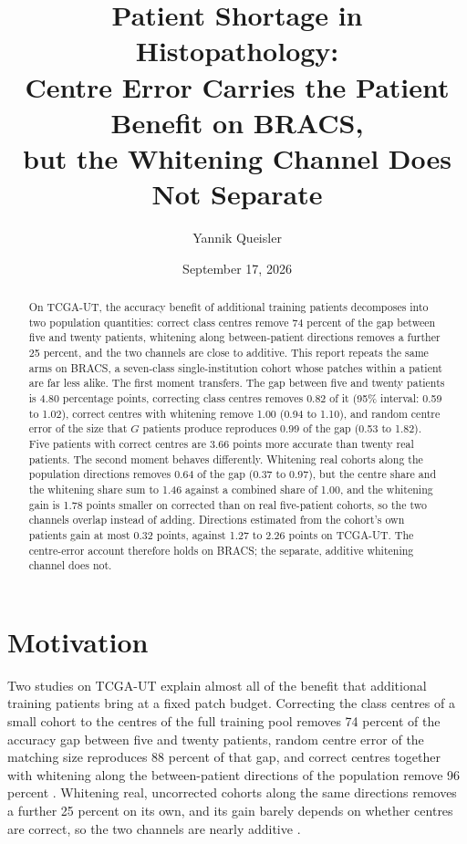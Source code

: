 \documentclass[11pt]{article}
\title{Patient Shortage in Histopathology:\\Centre Error Carries the Patient Benefit on BRACS,\\but the Whitening Channel Does Not Separate}
\author{Yannik Queisler}
\date{September 17, 2026}
\begin{document}
\raggedbottom
{}
\setlength{\emergencystretch}{2em}
\maketitle
\begin{abstract}
\noindent On TCGA-UT, the accuracy benefit of additional training patients decomposes into two population quantities: correct class centres remove 74 percent of the gap between five and twenty patients, whitening along between-patient directions removes a further 25 percent, and the two channels are close to additive. This report repeats the same arms on BRACS, a seven-class single-institution cohort whose patches within a patient are far less alike. The first moment transfers. The gap between five and twenty patients is 4.80 percentage points, correcting class centres removes 0.82 of it (95\% interval: 0.59 to 1.02), correct centres with whitening remove 1.00 (0.94 to 1.10), and random centre error of the size that $G$ patients produce reproduces 0.99 of the gap (0.53 to 1.82). Five patients with correct centres are 3.66 points more accurate than twenty real patients. The second moment behaves differently. Whitening real cohorts along the population directions removes 0.64 of the gap (0.37 to 0.97), but the centre share and the whitening share sum to 1.46 against a combined share of 1.00, and the whitening gain is 1.78 points smaller on corrected than on real five-patient cohorts, so the two channels overlap instead of adding. Directions estimated from the cohort's own patients gain at most 0.32 points, against 1.27 to 2.26 points on TCGA-UT. The centre-error account therefore holds on BRACS; the separate, additive whitening channel does not.
\end{abstract}

\section{Motivation}
\label{sec:motivation}
Two studies on TCGA-UT explain almost all of the benefit that additional training patients bring at a fixed patch budget. Correcting the class centres of a small cohort to the centres of the full training pool removes 74 percent of the accuracy gap between five and twenty patients, random centre error of the matching size reproduces 88 percent of that gap, and correct centres together with whitening along the between-patient directions of the population remove 96 percent \citep{queisler2026centreError}. Whitening real, uncorrected cohorts along the same directions removes a further 25 percent on its own, and its gain barely depends on whether centres are correct, so the two channels are nearly additive \citep{queisler2026patientDirections}.
\end{document}
